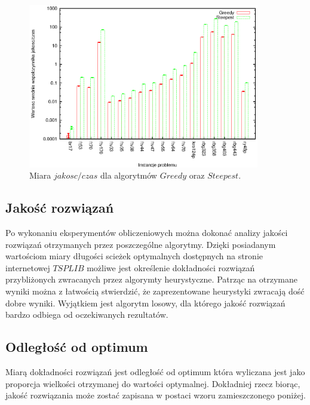 \begin{figure}
\begin{center}
\includegraphics[width=0.9\textwidth]{wykresy/steepest_greedy_jc}
\end{center}
\caption{Miara $jakosc/czas$ dla algorytmów $Greedy$ oraz $Steepest$.}
\label{steepest_greedy_jc}
\end{figure}

\clearpage


\subsection{Jakość rozwiązań}

Po wykonaniu eksperymentów obliczeniowych można dokonać analizy jakości
rozwiązań otrzymanych przez poszczególne algorytmy. Dzięki posiadanym
wartościom miary długości scieżek optymalnych dostępnych na
stronie internetowej $TSPLIB$ możliwe jest określenie dokładności
rozwiązań przybliżonych zwracanych przez algorymty heurystyczne. Patrząc
na otrzymane wyniki można z łatwością stwierdzić, że zaprezentowane
heurystyki zwracają dość dobre wyniki. Wyjątkiem jest algorytm
losowy, dla którego jakość rozwiązań bardzo odbiega od oczekiwanych
rezultatów.

\subsection{Odległość od optimum}

Miarą dokładności rozwiązań jest odległość od optimum
która wyliczana jest jako proporcja wielkości otrzymanej
do wartości optymalnej. Dokładniej rzecz biorąc, jakość rozwiązania
może zostać zapisana w postaci wzoru zamieszczonego poniżej.


